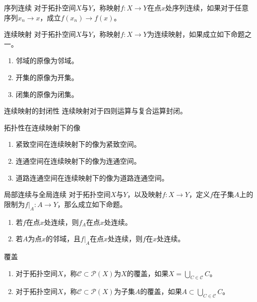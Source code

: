 \documentclass[lang = cn, scheme = chinese, thmcnt = section, usesamecnt]{elegantbook}
\newcommand{\sub}{\subset}             %
\begin{document}
\begin{definition}{序列连续}
	对于拓扑空间$X$与$Y$，称映射$f:X\to Y$在点$x$处序列连续，如果对于任意序列$x_n\to x$，成立$f(x_n)\to f(x)$。
\end{definition}

\begin{definition}{连续映射}
	对于拓扑空间$X$与$Y$，称映射$f:X\to Y$为连续映射，如果成立如下命题之一。
	\begin{enumerate}
		\item 邻域的原像为邻域。
		\item 开集的原像为开集。
		\item 闭集的原像为闭集。
	\end{enumerate}
\end{definition}

\begin{proposition}{连续映射的封闭性}
	连续映射对于四则运算与复合运算封闭。
\end{proposition}

\begin{definition}{拓扑性在连续映射下的像}
	\begin{enumerate}
		\item 紧致空间在连续映射下的像为紧致空间。
		\item 连通空间在连续映射下的像为连通空间。
		\item 道路连通空间在连续映射下的像为道路连通空间。
	\end{enumerate}
\end{definition}

\begin{theorem}{局部连续与全局连续}
	对于拓扑空间$X$与$Y$，以及映射$f:X\to Y$，定义$f$在子集$A$上的限制为$f|_A:A\to Y$，那么成立如下命题。
	\begin{enumerate}
		\item 若$f$在点$x$处连续，则$f_A$在点$x$处连续。
		\item 若$A$为点$x$的邻域，且$f|_A$在点$x$处连续，则$f$在$x$处连续。
	\end{enumerate}
\end{theorem}

\begin{definition}{覆盖}
	\begin{enumerate}
		\item 对于拓扑空间$X$，称$\mathscr{C}\sub \mathscr{P}(X)$为$X$的覆盖，如果$\displaystyle X=\bigcup_{C\in\mathscr{C}}C$。
		\item 对于拓扑空间$X$，称$\mathscr{C}\sub \mathscr{P}(X)$为子集$A$的覆盖，如果$\displaystyle A\sub \bigcup_{C\in\mathscr{C}}C$。
	\end{enumerate}
\end{definition}
\end{document}
